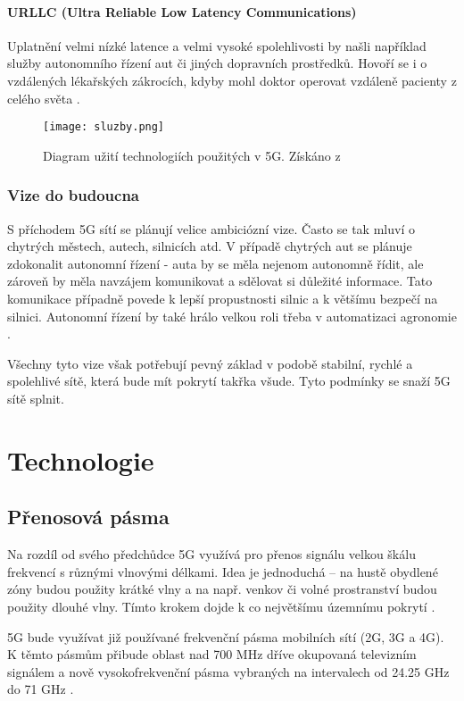 \subsubsection{URLLC (Ultra Reliable Low Latency Communications)}
Uplatnění velmi nízké latence a velmi vysoké spolehlivosti by našli například služby autonomního řízení aut či jiných dopravních prostředků. Hovoří se i o vzdálených lékařských zákrocích, kdyby mohl doktor operovat vzdáleně pacienty z celého světa \cite{UseCases}. 

\begin{figure}[ht]
\centering
    \texttt{[image: sluzby.png]}
    \caption{Diagram užití technologiích použitých v 5G. Získáno z \cite{Cetin}}
   \label{fig:mods}
\end{figure}
\subsection{Vize do budoucna}
   S příchodem 5G sítí se plánují velice ambiciózní  vize. Často se tak mluví o chytrých městech, autech, silnicích atd. V případě chytrých aut se plánuje zdokonalit autonomní řízení - auta by se měla nejenom autonomně řídit, ale zároveň by měla navzájem komunikovat a sdělovat si důležité informace. Tato komunikace případně povede k lepší propustnosti silnic a k většímu bezpečí na silnici. Autonomní řízení by také hrálo velkou roli třeba v automatizaci agronomie \cite{Cetin}. 
\par
Všechny tyto vize však potřebují pevný základ v podobě stabilní, rychlé a spolehlivé sítě, která bude mít pokrytí takřka všude. Tyto podmínky se snaží 5G sítě splnit.

\chapter{Technologie}

\section{Přenosová pásma}
Na rozdíl od svého předchůdce 5G využívá pro přenos signálu velkou škálu frekvencí s různými vlnovými délkami. 
Idea je jednoduchá -- na hustě obydlené zóny budou použity krátké vlny  a na např. venkov či volné prostranství budou použity dlouhé vlny.  Tímto krokem dojde k co největšímu územnímu pokrytí \cite{Cetin}.
\par
5G bude využívat již používané frekvenční pásma mobilních sítí (2G, 3G a 4G). K těmto pásmům přibude oblast nad 700 MHz dříve okupovaná televizním signálem a nově vysokofrekvenční pásma vybraných na intervalech od 24.25 GHz do 71 GHz \cite{pasma}.

